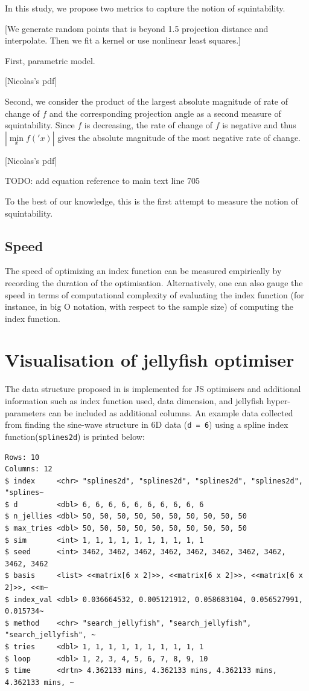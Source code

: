 \documentclass[
  number,
  preprint,
  3p]{elsarticle}
\begin{document}
In this study, we propose two metrics to capture the notion of
squintability.

{[}We generate random points that is beyond 1.5 projection distance and
interpolate. Then we fit a kernel or use nonlinear least squares.{]}

First, parametric model.

{[}Nicolas's pdf{]}

Second, we consider the product of the largest absolute magnitude of
rate of change of \(f\) and the corresponding projection angle as a
second measure of squintability. Since \(f\) is decreasing, the rate of
change of \(f\) is negative and thus \(|\underset{x}{\min} f('x)|\)
gives the absolute magnitude of the most negative rate of change.

{[}Nicolas's pdf{]}

TODO: add equation reference to main text line 705

To the best of our knowledge, this is the first attempt to measure the
notion of squintability.

\subsection{Speed}\label{speed}

The speed of optimizing an index function can be measured empirically by
recording the duration of the optimisation. Alternatively, one can also
gauge the speed in terms of computational complexity of evaluating the
index function (for instance, in big O notation, with respect to the
sample size) of computing the index function.

\section{Visualisation of jellyfish optimiser}\label{sec-vis}

The data structure proposed in \citet{RJ-2021-105} is implemented for JS
optimisers and additional information such as index function used, data
dimension, and jellyfish hyper-parameters can be included as additional
columns. An example data collected from finding the sine-wave structure
in 6D data (\texttt{d\ =\ 6}) using a spline index
function(\texttt{splines2d}) is printed below:

\begin{verbatim}
Rows: 10
Columns: 12
$ index     <chr> "splines2d", "splines2d", "splines2d", "splines2d", "splines~
$ d         <dbl> 6, 6, 6, 6, 6, 6, 6, 6, 6, 6
$ n_jellies <dbl> 50, 50, 50, 50, 50, 50, 50, 50, 50, 50
$ max_tries <dbl> 50, 50, 50, 50, 50, 50, 50, 50, 50, 50
$ sim       <int> 1, 1, 1, 1, 1, 1, 1, 1, 1, 1
$ seed      <int> 3462, 3462, 3462, 3462, 3462, 3462, 3462, 3462, 3462, 3462
$ basis     <list> <<matrix[6 x 2]>>, <<matrix[6 x 2]>>, <<matrix[6 x 2]>>, <<m~
$ index_val <dbl> 0.036664532, 0.005121912, 0.058683104, 0.056527991, 0.015734~
$ method    <chr> "search_jellyfish", "search_jellyfish", "search_jellyfish", ~
$ tries     <dbl> 1, 1, 1, 1, 1, 1, 1, 1, 1, 1
$ loop      <dbl> 1, 2, 3, 4, 5, 6, 7, 8, 9, 10
$ time      <drtn> 4.362133 mins, 4.362133 mins, 4.362133 mins, 4.362133 mins, ~
\end{verbatim}
\end{document}
